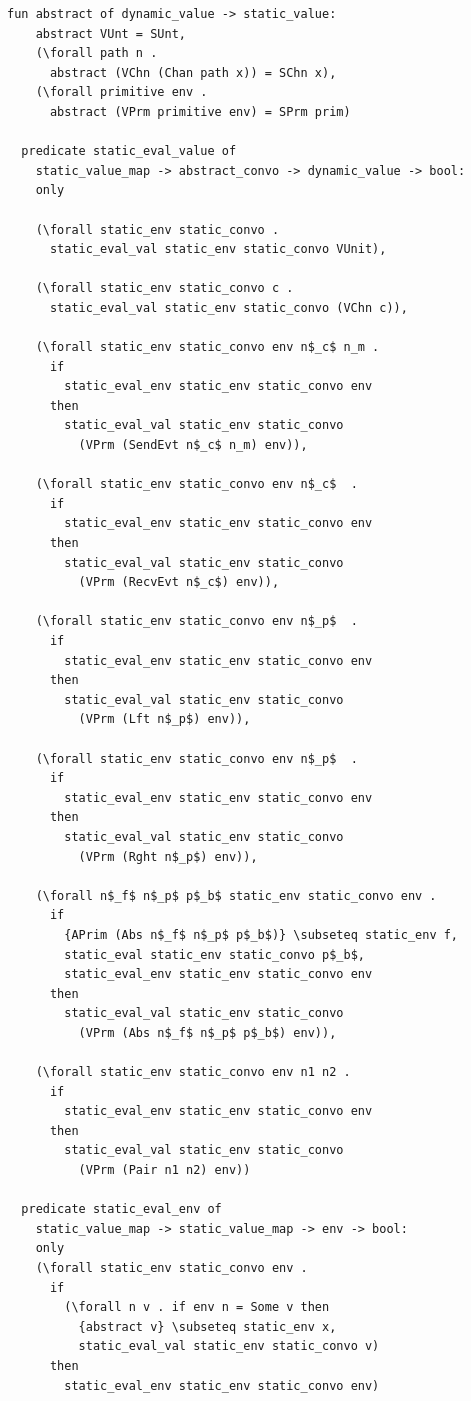 \documentclass{article}
\begin{document}
\begin{lstlisting}[language=logic, mathescape]
  fun abstract of dynamic_value -> static_value:
    abstract VUnt = SUnt, 
    (\forall path n . 
      abstract (VChn (Chan path x)) = SChn x),
    (\forall primitive env .
      abstract (VPrm primitive env) = SPrm prim)

  predicate static_eval_value of
    static_value_map -> abstract_convo -> dynamic_value -> bool: 
    only

    (\forall static_env static_convo .
      static_eval_val static_env static_convo VUnit),

    (\forall static_env static_convo c .
      static_eval_val static_env static_convo (VChn c)),

    (\forall static_env static_convo env n$_c$ n_m .
      if
        static_eval_env static_env static_convo env
      then
        static_eval_val static_env static_convo
          (VPrm (SendEvt n$_c$ n_m) env)),

    (\forall static_env static_convo env n$_c$  .
      if
        static_eval_env static_env static_convo env
      then
        static_eval_val static_env static_convo
          (VPrm (RecvEvt n$_c$) env)),

    (\forall static_env static_convo env n$_p$  .
      if
        static_eval_env static_env static_convo env
      then
        static_eval_val static_env static_convo
          (VPrm (Lft n$_p$) env)),
        
    (\forall static_env static_convo env n$_p$  .
      if
        static_eval_env static_env static_convo env
      then
        static_eval_val static_env static_convo
          (VPrm (Rght n$_p$) env)),

    (\forall n$_f$ n$_p$ p$_b$ static_env static_convo env .
      if
        {APrim (Abs n$_f$ n$_p$ p$_b$)} \subseteq static_env f, 
        static_eval static_env static_convo p$_b$, 
        static_eval_env static_env static_convo env
      then
        static_eval_val static_env static_convo
          (VPrm (Abs n$_f$ n$_p$ p$_b$) env)),

    (\forall static_env static_convo env n1 n2 .
      if
        static_eval_env static_env static_convo env
      then
        static_eval_val static_env static_convo
          (VPrm (Pair n1 n2) env))

  predicate static_eval_env of
    static_value_map -> static_value_map -> env -> bool:
    only 
    (\forall static_env static_convo env .
      if
        (\forall n v . if env n = Some v then
          {abstract v} \subseteq static_env x,
          static_eval_val static_env static_convo v)
      then 
        static_eval_env static_env static_convo env)


\end{lstlisting}
\end{document}
